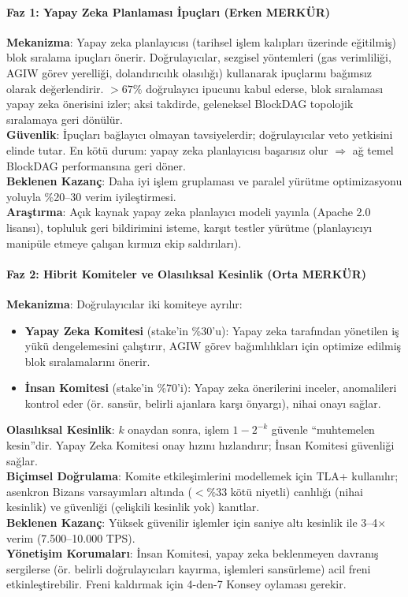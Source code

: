 \documentclass[11pt]{article}
\begin{document}
\paragraph{Faz 1: Yapay Zeka Planlaması İpuçları (Erken MERKÜR)}
\textbf{Mekanizma}: Yapay zeka planlayıcısı (tarihsel işlem kalıpları üzerinde eğitilmiş) blok sıralama ipuçları önerir. Doğrulayıcılar, sezgisel yöntemleri (gas verimliliği, AGIW görev yerelliği, dolandırıcılık olasılığı) kullanarak ipuçlarını bağımsız olarak değerlendirir. $>67\%$ doğrulayıcı ipucunu kabul ederse, blok sıralaması yapay zeka önerisini izler; aksi takdirde, geleneksel BlockDAG topolojik sıralamaya geri dönülür.\\
\textbf{Güvenlik}: İpuçları bağlayıcı olmayan tavsiyelerdir; doğrulayıcılar veto yetkisini elinde tutar. En kötü durum: yapay zeka planlayıcısı başarısız olur $\Rightarrow$ ağ temel BlockDAG performansına geri döner.\\
\textbf{Beklenen Kazanç}: Daha iyi işlem gruplaması ve paralel yürütme optimizasyonu yoluyla \%20--30 verim iyileştirmesi.\\
\textbf{Araştırma}: Açık kaynak yapay zeka planlayıcı modeli yayınla (Apache 2.0 lisansı), topluluk geri bildirimini isteme, karşıt testler yürütme (planlayıcıyı manipüle etmeye çalışan kırmızı ekip saldırıları).

\paragraph{Faz 2: Hibrit Komiteler ve Olasılıksal Kesinlik (Orta MERKÜR)}
\textbf{Mekanizma}: Doğrulayıcılar iki komiteye ayrılır:
\begin{itemize}[noitemsep]
  \item \textbf{Yapay Zeka Komitesi} (stake'in \%30'u): Yapay zeka tarafından yönetilen iş yükü dengelemesini çalıştırır, AGIW görev bağımlılıkları için optimize edilmiş blok sıralamalarını önerir.
  \item \textbf{İnsan Komitesi} (stake'in \%70'i): Yapay zeka önerilerini inceler, anomalileri kontrol eder (ör. sansür, belirli ajanlara karşı önyargı), nihai onayı sağlar.
\end{itemize}
\textbf{Olasılıksal Kesinlik}: $k$ onaydan sonra, işlem $1 - 2^{-k}$ güvenle ``muhtemelen kesin''dir. Yapay Zeka Komitesi onay hızını hızlandırır; İnsan Komitesi güvenliği sağlar.\\
\textbf{Biçimsel Doğrulama}: Komite etkileşimlerini modellemek için TLA+ kullanılır; asenkron Bizans varsayımları altında ($<\%33$ kötü niyetli) canlılığı (nihai kesinlik) ve güvenliği (çelişkili kesinlik yok) kanıtlar.\\
\textbf{Beklenen Kazanç}: Yüksek güvenilir işlemler için saniye altı kesinlik ile 3--4$\times$ verim (7.500--10.000 TPS).\\
\textbf{Yönetişim Korumaları}: İnsan Komitesi, yapay zeka beklenmeyen davranış sergilerse (ör. belirli doğrulayıcıları kayırma, işlemleri sansürleme) acil freni etkinleştirebilir. Freni kaldırmak için 4-den-7 Konsey oylaması gerekir.
\end{document}
